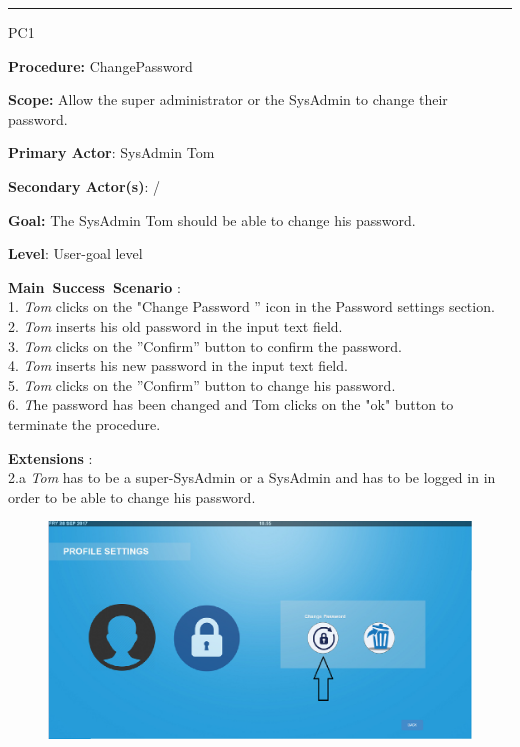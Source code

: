 \hrule
\vspace{0.5cm}
\begin{lyxlist}{PC1}
\small{
\item [\textbf{Procedure:}] ChangePassword 
\item [\textbf{Scope:}] Allow the super administrator or the SysAdmin to change
their password.
\item [\textbf{Primary Actor}:] SysAdmin Tom
\item [\textbf{Secondary Actor(s)}:] /
\item [\textbf{Goal:}] The SysAdmin Tom should be able to change his password.
\item [\textbf{Level}:] User-goal level
\item [\textbf{Main~Success~Scenario}]:\\
1. \emph{Tom} clicks on the "Change Password '' icon in the Password settings
section.\\
2. \emph{Tom} inserts his old password in the input text field.\\
3. \emph{Tom} clicks on the ''Confirm'' button to confirm the password.\\
4. \emph{Tom} inserts his new password in the input text field.\\
5. \emph{Tom} clicks on the ''Confirm'' button to change his password.\\
6. \emph The password has been changed and {Tom} clicks on the "ok" button
to terminate the procedure.\\

\item [\textbf{Extensions}]:\\
2.a \emph{Tom} has to be a super-SysAdmin or a SysAdmin and has to be logged in
in order to be able to change his password.\\
}

\begin{figure}[H]
\centering
\includegraphics[width=170mm]{images/PasswordChange1.eps}
\caption{\label{overflow}}
\end{figure}


\end{lyxlist}
